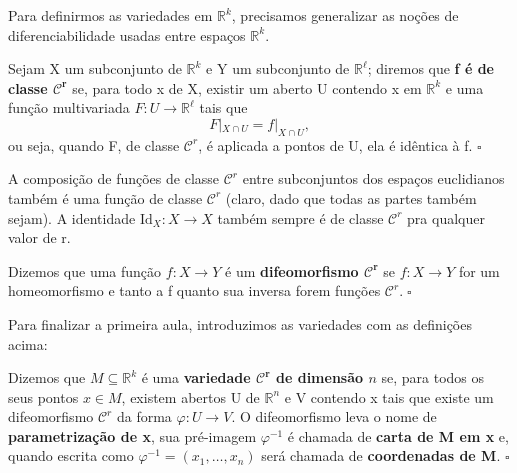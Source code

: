 \documentclass[../differential_topology.tex]{subfiles}
\begin{document}
Para definirmos as variedades em \(\mathbb{R}^{k}\), precisamos generalizar as noções de diferenciabilidade usadas entre espaços \(\mathbb{R}^{k}\).
\begin{def*}
	Sejam X um subconjunto de \(\mathbb{R}^{k}\) e Y um subconjunto de \(\mathbb{R}^{\ell }\); diremos que \textbf{f é de classe \(\mathbf{\mathcal{C}^{r}}\)} se, para todo x de X, existir um aberto U contendo x em \(\mathbb{R}^{k}\) e uma função multivariada \(F:U\rightarrow \mathbb{R}^{\ell }\) tais que
	\[
		F |_{X\cap U} = f |_{X\cap U},
	\]
	ou seja, quando F, de classe \(\mathcal{C}^{r}\), é aplicada a pontos de U, ela é idêntica à f. \(\square\)
\end{def*}

\begin{tcolorbox}[
		skin=enhanced,
		title=Observação,
		fonttitle=\bfseries,
		colframe=black,
		colbacktitle=cyan!75!white,
		colback=cyan!15,
		colbacklower=black,
		coltitle=black,
		drop fuzzy shadow,
	]
	A composição de funções de classe \(\mathcal{C}^{r}\) entre subconjuntos dos espaços euclidianos também é uma função de classe \(\mathcal{C}^{r}\) (claro, dado que todas as partes também sejam).
	A identidade \(\mathrm{Id}_{X}:X\rightarrow X\) também sempre é de classe \(\mathcal{C}^{r}\) pra qualquer valor de r.
\end{tcolorbox}

\begin{def*}
	Dizemos que uma função \(f:X\rightarrow Y\) é um \textbf{difeomorfismo \(\mathbf{\mathcal{C}^{r}}\)} se \(f:X\rightarrow Y\) for um homeomorfismo e tanto a f quanto sua inversa forem funções \(\mathcal{C}^{r}.\; \square\)
\end{def*}

Para finalizar a primeira aula, introduzimos as variedades com as definições acima:
\begin{def*}
	Dizemos que \(M\subseteq \mathbb{R}^{k}\) é uma \textbf{variedade \(\mathbf{\mathcal{C}^{r}}\) de dimensão \(n\)} se, para todos os seus pontos \(x\in M\), existem abertos U de \(\mathbb{R}^{n}\) e V contendo x tais que existe um difeomorfismo \(\mathcal{C}^{r}\) da forma \(\varphi :U\rightarrow V\).
	O difeomorfismo leva o nome de \textbf{parametrização de x}, sua pré-imagem \(\varphi^{-1}\) é chamada de \textbf{carta de M em x} e, quando escrita como \(\varphi^{-1}=(x_1, \dotsc , x_{n})\) será chamada de \textbf{coordenadas de M}. \(\square\)
\end{def*}
\end{document}
